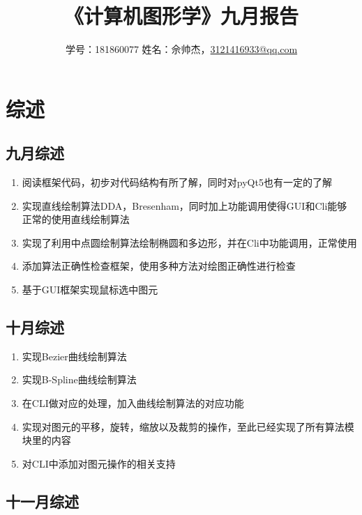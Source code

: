 \documentclass[a4paper,UTF8]{article}
\theoremstyle{definition}
\begin{document}
\title{\textbf{《计算机图形学》九月报告}}
\author{学号：181860077 姓名：佘帅杰，\href{mailto:3121416933@qq.com}{3121416933@qq.com}}
\maketitle

\section{综述}
\subsection{九月综述}
\begin{enumerate}
    \item 阅读框架代码，初步对代码结构有所了解，同时对pyQt5也有一定的了解
    
    \item 实现直线绘制算法DDA，Bresenham，同时加上功能调用使得GUI和Cli能够
    正常的使用直线绘制算法
    
    \item 实现了利用中点圆绘制算法绘制椭圆和多边形，并在Cli中功能调用，正常使用

    \item 添加算法正确性检查框架，使用多种方法对绘图正确性进行检查
    
    \item 基于GUI框架实现鼠标选中图元
\end{enumerate}

\subsection{十月综述}
\begin{enumerate}
    \item 实现Bezier曲线绘制算法
    
    \item 实现B-Spline曲线绘制算法
    
    \item 在CLI做对应的处理，加入曲线绘制算法的对应功能

    \item 实现对图元的平移，旋转，缩放以及裁剪的操作，至此已经实现了所有算法模块里的内容
    
    \item 对CLI中添加对图元操作的相关支持
\end{enumerate}

\subsection{十一月综述}
\end{document}
